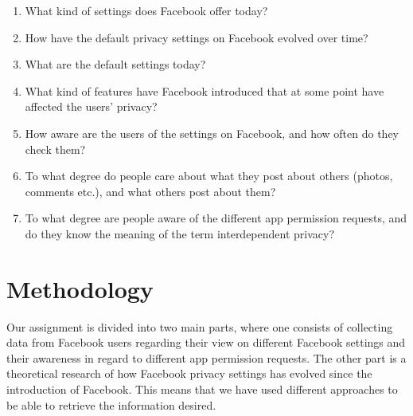 \begin{enumerate}
\item What kind of settings does Facebook offer today?
\item How have the default privacy settings on Facebook evolved over time?
\item What are the default settings today?
\item What kind of features have Facebook introduced that at some point have affected the users' privacy?
\item How aware are the users of the settings on Facebook, and how often do they check them?
\item To what degree do people care about what they post about others (photos, comments etc.), and what others post about them? 
\item To what degree are people aware of the different app permission requests, and do they know the meaning of the term interdependent privacy?
\end{enumerate}



\section{Methodology}
\label{sec:methodology}
Our assignment is divided into two main parts, where one consists of collecting data from Facebook users regarding their view on different Facebook settings and their awareness in regard to different app permission requests. The other part is a theoretical research of how Facebook privacy settings has evolved since the introduction of Facebook. This means that we have used different approaches to be able to retrieve the information desired.

